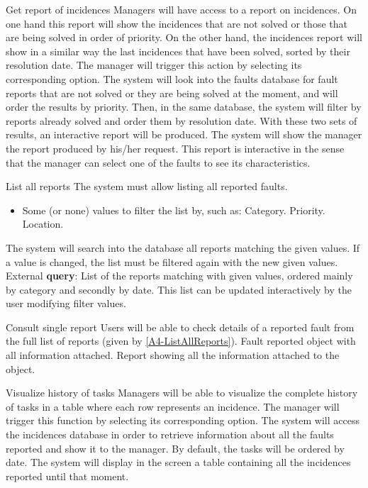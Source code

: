 \begin{requirement}{Get report of incidences}
\reqdesc Managers will have access to a report on incidences. On one hand this report will show the incidences that are not solved or those that are being solved in order of priority. On the other hand, the incidences report will show in a similar way the last incidences that have been solved, sorted by
their resolution date.
\reqin The manager will trigger this action by selecting its corresponding option.
\reqsteps The system will look into the faults database for fault reports that are not solved or they are being solved at the moment, and will order the results by priority. Then, in the same database, the system will filter by reports already solved and order them by resolution date. With these two sets of results, an interactive report will be produced.
\reqout The system will show the manager the report produced by his/her request. This report is interactive in the sense that the manager can select one of the faults to see its characteristics.
\end{requirement}

\begin{requirement}{List all reports}\label{A4-ListAllReports}
\reqdesc The system must allow listing all reported faults.
\reqin
\begin{itemize}
 	\item Some (or none) values to filter the list by, such as:
 		\subitem Category.
 		\subitem Priority.
 		\subitem Location.
 \end{itemize}
\reqsteps The system will search into the database all reports matching the given values. If a value is changed, the list must be filtered again with the new given values.
\reqout External \textbf{query}: List of the reports matching with given values, ordered mainly by category and secondly by date. This list can be updated interactively by the user modifying filter values.
\end{requirement}

\begin{requirement}{Consult single report}
\reqdesc Users will be able to check details of a reported fault from the full list of reports (given by \ref{A4-ListAllReports}).
\reqin Fault reported object with all information attached.
\reqout Report showing all the information attached to the object.
\end{requirement}


\begin{requirement}{Visualize history of tasks}
\reqdesc Managers will be able to visualize the complete
history of tasks in a table where each row represents an incidence.
\reqin The manager will trigger this function by selecting its corresponding option.
\reqsteps The system will access the incidences database in order to retrieve information about all the faults reported and show it to the manager. By default, the tasks will be ordered by date.
\reqout The system will display in the screen a table containing all the incidences reported until that moment.
\end{requirement}

